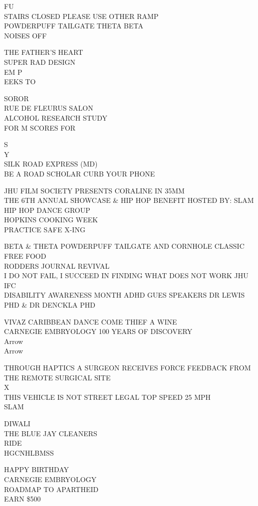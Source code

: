 \documentclass[10pt,letterpaper]{article}
\begin{document}
FU\\
STAIRS CLOSED PLEASE USE OTHER RAMP\\
POWDERPUFF TAILGATE THETA BETA\\
NOISES OFF

THE FATHER'S HEART\\
SUPER RAD DESIGN\\
EM P\\
EEKS TO

SOROR\\
RUE DE FLEURUS SALON\\
ALCOHOL RESEARCH STUDY\\
FOR M SCORES FOR

S\\
Y\\
SILK ROAD EXPRESS (MD)\\
BE A ROAD SCHOLAR CURB YOUR PHONE

JHU FILM SOCIETY PRESENTS CORALINE IN 35MM\\
THE 6TH ANNUAL SHOWCASE \& HIP HOP BENEFIT HOSTED BY: SLAM HIP HOP DANCE GROUP\\
HOPKINS COOKING WEEK\\
PRACTICE SAFE X{-}ING

BETA \& THETA POWDERPUFF TAILGATE AND CORNHOLE CLASSIC FREE FOOD\\
RODDERS JOURNAL REVIVAL\\
I DO NOT FAIL, I SUCCEED IN FINDING WHAT DOES NOT WORK JHU IFC\\
DISABILITY AWARENESS MONTH ADHD GUES SPEAKERS DR LEWIS PHD \& DR DENCKLA PHD

VIVAZ CARIBBEAN DANCE COME THIEF A WINE\\
CARNEGIE EMBRYOLOGY 100 YEARS OF DISCOVERY\\
Arrow\\
Arrow

THROUGH HAPTICS A SURGEON RECEIVES FORCE FEEDBACK FROM THE REMOTE SURGICAL SITE\\
X\\
THIS VEHICLE IS NOT STREET LEGAL TOP SPEED 25 MPH\\
SLAM

DIWALI\\
THE BLUE JAY CLEANERS\\
RIDE\\
HGCNHLBMSS

HAPPY BIRTHDAY\\
CARNEGIE EMBRYOLOGY\\
ROADMAP TO APARTHEID\\
EARN \$500
\end{document}
